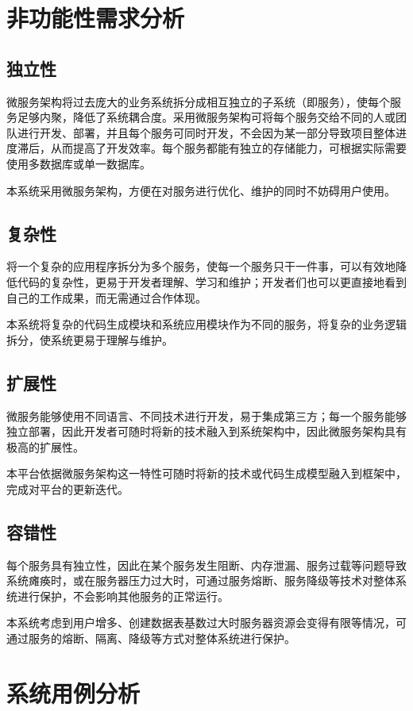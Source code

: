 \documentclass{izdthesis}
\begin{document}
\section{非功能性需求分析}

\subsection{独立性}
微服务架构将过去庞大的业务系统拆分成相互独立的子系统（即服务），使每个服务足够内聚，降低了系统耦合度。采用微服务架构可将每个服务交给不同的人或团队进行开发、部署，并且每个服务可同时开发，不会因为某一部分导致项目整体进度滞后，从而提高了开发效率。每个服务都能有独立的存储能力，可根据实际需要使用多数据库或单一数据库。

本系统采用微服务架构，方便在对服务进行优化、维护的同时不妨碍用户使用。

\subsection{复杂性}
将一个复杂的应用程序拆分为多个服务，使每一个服务只干一件事，可以有效地降低代码的复杂性，更易于开发者理解、学习和维护；开发者们也可以更直接地看到自己的工作成果，而无需通过合作体现。

本系统将复杂的代码生成模块和系统应用模块作为不同的服务，将复杂的业务逻辑拆分，使系统更易于理解与维护。

\subsection{扩展性}
微服务能够使用不同语言、不同技术进行开发，易于集成第三方；每一个服务能够独立部署，因此开发者可随时将新的技术融入到系统架构中，因此微服务架构具有极高的扩展性。

本平台依据微服务架构这一特性可随时将新的技术或代码生成模型融入到框架中，完成对平台的更新迭代。

\subsection{容错性}
每个服务具有独立性，因此在某个服务发生阻断、内存泄漏、服务过载等问题导致系统瘫痪时，或在服务器压力过大时，可通过服务熔断、服务降级等技术对整体系统进行保护，不会影响其他服务的正常运行。

本系统考虑到用户增多、创建数据表基数过大时服务器资源会变得有限等情况，可通过服务的熔断、隔离、降级等方式对整体系统进行保护。

\section{系统用例分析}
\end{document}
